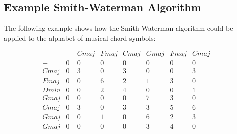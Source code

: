 \subsection{Example Smith-Waterman Algorithm}

The following example shows how the Smith-Waterman algorithm could be applied to the alphabet of musical chord symbols:

\[ \begin{array}{cccccccc} & - & Cmaj & Fmaj & Cmaj & Gmaj & Fmaj & Cmaj & \\ - & 0 & 0 & 0 & 0 & 0 & 0 & 0 & \\ Cmaj & 0 & 3 & 0 & 3 & 0 & 0 & 3 & \\ Fmaj & 0 & 0 & 6 & 2 & 1 & 3 & 0 & \\ Dmin & 0 & 0 & 2 & 4 & 0 & 0 & 1 & \\ Gmaj & 0 & 0 & 0 & 0 & 7 & 3 & 0 & \\ Cmaj & 0 & 3 & 0 & 3 & 3 & 5 & 6 & \\ Gmaj & 0 & 0 & 1 & 0 & 6 & 2 & 3 & \\ Gmaj & 0 & 0 & 0 & 0 & 3 & 4 & 0 & \\ \end{array} \]
